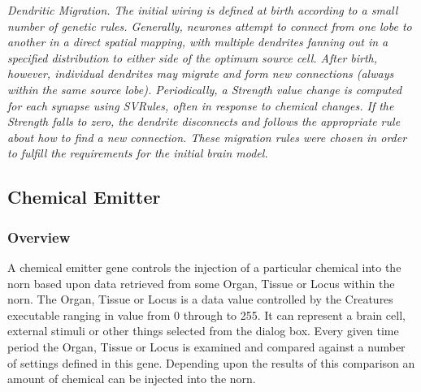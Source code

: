 \documentclass[11pt,twoside,a4paper]{article}
\begin{document}
\clearpage

\emph{Dendritic Migration. The initial wiring is defined at birth according to a small number of genetic rules. Generally, neurones attempt to connect from one lobe to another in a direct spatial mapping, with multiple dendrites fanning out in a specified distribution to either side of the optimum source cell. After birth, however, individual dendrites may migrate and form new connections (always within the same source lobe). Periodically, a Strength value change is computed for each synapse using SVRules, often in response to chemical changes. If the Strength falls to zero, the dendrite disconnects and follows the appropriate rule about how to find a new connection. These migration rules were chosen in order to fulfill the requirements for the initial brain model.}


\subsection{Chemical Emitter} %

\subsubsection{Overview}

A chemical emitter gene controls the injection of a particular chemical into the norn based upon data retrieved from some Organ, Tissue or Locus within the norn. The Organ, Tissue or Locus is a data value controlled by the Creatures executable ranging in value from 0 through to 255. It can represent a brain cell, external stimuli or other things selected from the dialog box. Every given time period the Organ, Tissue or Locus is examined and compared against a number of settings defined in this gene. Depending upon the results of this comparison an amount of chemical can be injected into the norn.~\\

\end{document}
